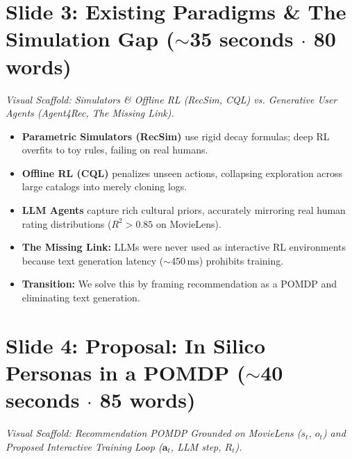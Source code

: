 \documentclass[]{0_aga-homework}
\begin{document}
\section*{Slide 3: Existing Paradigms \& The Simulation Gap ($\sim$35 seconds $\cdot$ 80 words)}
\noindent\textit{Visual Scaffold: Simulators \& Offline RL (RecSim, CQL) vs. Generative User Agents (Agent4Rec, The Missing Link).}

\begin{itemize}
  \item \textbf{Parametric Simulators (RecSim)} use rigid decay formulas; deep RL overfits to toy rules, failing on real humans.
  \item \textbf{Offline RL (CQL)} penalizes unseen actions, collapsing exploration across large catalogs into merely cloning logs.
  \item \textbf{LLM Agents} capture rich cultural priors, accurately mirroring real human rating distributions ($R^2 > 0.85$ on MovieLens).
  \item \textbf{The Missing Link:} LLMs were never used as interactive RL environments because text generation latency ($\sim 450\,\text{ms}$) prohibits training.
  \item \textbf{Transition:} We solve this by framing recommendation as a POMDP and eliminating text generation.
\end{itemize}

\section*{Slide 4: Proposal: In Silico Personas in a POMDP ($\sim$40 seconds $\cdot$ 85 words)}
\noindent\textit{Visual Scaffold: Recommendation POMDP Grounded on MovieLens ($s_t$, $o_t$) and Proposed Interactive Training Loop ($\bm{a}_t$, LLM step, $R_t$).}
\end{document}
